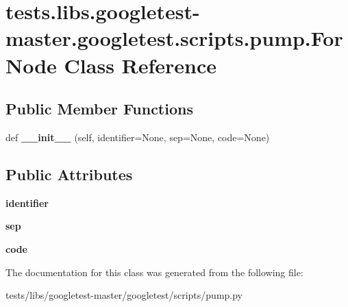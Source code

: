 \hypertarget{classtests_1_1libs_1_1googletest-master_1_1googletest_1_1scripts_1_1pump_1_1ForNode}{}\section{tests.\+libs.\+googletest-\/master.googletest.\+scripts.\+pump.\+For\+Node Class Reference}
\label{classtests_1_1libs_1_1googletest-master_1_1googletest_1_1scripts_1_1pump_1_1ForNode}
\subsection*{Public Member Functions}
\begin{DoxyCompactItemize}
\item 
\mbox{\label{classtests_1_1libs_1_1googletest-master_1_1googletest_1_1scripts_1_1pump_1_1ForNode_aaa22dbe763849b9e4091af7645d1eeb6}} 
def {\bfseries \+\_\+\+\_\+init\+\_\+\+\_\+} (self, identifier=None, sep=None, code=None)
\end{DoxyCompactItemize}
\subsection*{Public Attributes}
\begin{DoxyCompactItemize}
\item 
\mbox{\label{classtests_1_1libs_1_1googletest-master_1_1googletest_1_1scripts_1_1pump_1_1ForNode_adc712aa65574ff8c976f765afbe6388b}} 
{\bfseries identifier}
\item 
\mbox{\label{classtests_1_1libs_1_1googletest-master_1_1googletest_1_1scripts_1_1pump_1_1ForNode_a341565a52f0e505dfca280f812edef6e}} 
{\bfseries sep}
\item 
\mbox{\label{classtests_1_1libs_1_1googletest-master_1_1googletest_1_1scripts_1_1pump_1_1ForNode_a0fb6fe68d78fd2fb2736541c5086ea6f}} 
{\bfseries code}
\end{DoxyCompactItemize}


The documentation for this class was generated from the following file\+:\begin{DoxyCompactItemize}
\item 
tests/libs/googletest-\/master/googletest/scripts/pump.\+py\end{DoxyCompactItemize}
